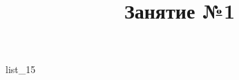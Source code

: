 \documentclass[12pt, a4paper]{article}
\begin{document}
	\title{Занятие №1}
	{list_15}
\end{document}
